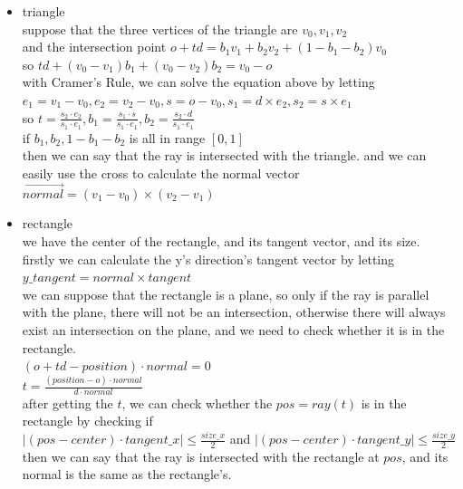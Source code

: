 \documentclass[acmtog]{acmart}
\begin{document}
\begin{itemize}
	\item triangle
		\\
		suppose that the three vertices of the triangle are $v_0, v_1, v_2$\\
		and the intersection point $o + td = b_1v_1 + b_2v_2 + (1 - b_1 - b_2)v_0$\\
		so $td + (v_0-v_1)b_1 + (v_0-v_2)b_2 = v_0 - o$\\
		with Cramer's Rule, we can solve the equation above by letting\\
		$e_1 = v_1 - v_0, e_2 = v_2 - v_0, s = o - v_0, s_1 = d \times e_2, s_2 = s \times e_1$\\
		so $t = \frac{s_2 \cdot e_2}{s_1\cdot e_1}, b_1 = \frac{s_1 \cdot s}{s_1 \cdot e_1} , b_2 = \frac{s_2 \cdot d}{s_1 \cdot e_1}$\\
		if $b_1, b_2, 1 - b_1 - b_2$ is all in range $[0,1]$\\
		then we can say that the ray is intersected with the triangle.
		and we can easily use the cross to calculate the normal vector $\vec{normal} = (v_1 - v_0) \times (v_2 - v_1)$

	\item rectangle
		\\
		we have the center of the rectangle, and its tangent vector, and its size.\\
		firstly we can calculate the y's direction's tangent vector by letting $y\_tangent = normal \times tangent$\\
		we can suppose that the rectangle is a plane, so only if the ray is parallel with the plane, there will not be an intersection,
		otherwise there will always exist an intersection on the plane, and we need to check whether it is in the rectangle.\\
		$ (o + td - position) \cdot normal = 0$\\
  		$ t = \frac{(position-o) \cdot normal}{d\cdot normal}$\\
		after getting the $t$, we can check whether the $pos = ray(t)$ is in the rectangle by checking if\\
		$|(pos - center) \cdot tangent\_x| \leq \frac{size\_x}{2}$ and $|(pos - center) \cdot tangent\_y| \leq \frac{size\_y}{2}$\\
		then we can say that the ray is intersected with the rectangle at $pos$, and its normal is the same as the rectangle's.


\end{itemize}
\end{document}
